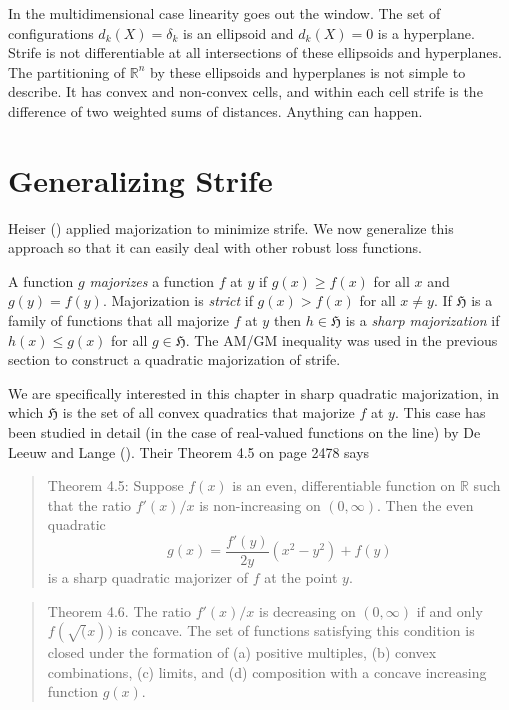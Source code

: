 \documentclass[
  12pt,
  letterpaper,
  DIV=11,
  numbers=noendperiod]{scrartcl}
\newcommand{\sectionbreak}{\pagebreak}
\begin{document}
In the multidimensional case linearity goes out the window. The set of
configurations \(d_k(X)=\delta_k\) is an ellipsoid and \(d_k(X)=0\) is a
hyperplane. Strife is not differentiable at all intersections of these
ellipsoids and hyperplanes. The partitioning of \(\mathbb{R}^n\) by
these ellipsoids and hyperplanes is not simple to describe. It has
convex and non-convex cells, and within each cell strife is the
difference of two weighted sums of distances. Anything can happen.

\sectionbreak

\section{Generalizing Strife}\label{generalizing-strife}

Heiser () applied majorization to minimize
strife. We now generalize this approach so that it can easily deal with
other robust loss functions.

A function \(g\) \emph{majorizes} a function \(f\) at \(y\) if
\(g(x)\geq f(x)\) for all \(x\) and \(g(y)=f(y)\). Majorization is
\emph{strict} if \(g(x)>f(x)\) for all \(x\not= y\). If \(\mathfrak{H}\)
is a family of functions that all majorize \(f\) at \(y\) then
\(h\in\mathfrak{H}\) is a \emph{sharp majorization} if \(h(x)\leq g(x)\)
for all \(g\in\mathfrak{H}\). The AM/GM inequality was used in the
previous section to construct a quadratic majorization of strife.

We are specifically interested in this chapter in sharp quadratic
majorization, in which \(\mathfrak{H}\) is the set of all convex
quadratics that majorize \(f\) at \(y\). This case has been studied in
detail (in the case of real-valued functions on the line) by De Leeuw
and Lange (). Their Theorem 4.5
on page 2478 says

\begin{quote}
Theorem 4.5: Suppose \(f(x)\) is an even, differentiable function on
\(\mathbb{R}\) such that the ratio \(f'(x)/x\) is non-increasing on
\((0,\infty)\). Then the even quadratic \begin{equation}
g(x)=\frac{f'(y)}{2y}(x^2-y^2)+f(y)\label{eq:sharp}
\end{equation} is a sharp quadratic majorizer of \(f\) at the point
\(y\).
\end{quote}

\begin{quote}
Theorem 4.6. The ratio \(f'(x)/x\) is decreasing on \((0,\infty)\) if
and only \(f(\sqrt(x))\) is concave. The set of functions satisfying
this condition is closed under the formation of (a) positive multiples,
(b) convex combinations, (c) limits, and (d) composition with a concave
increasing function \(g(x)\).
\end{quote}
\end{document}
